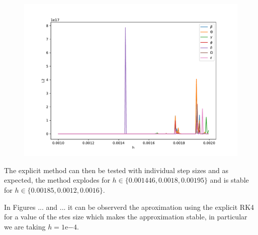 \documentclass{report}
\begin{document}
\begin{figure}[h]
\begin{minipage}[t]{0.5	\textwidth}
\centering
\includegraphics[width=\textwidth]{../Plots/RK4_Proj2/L2_norm_different_k.pdf}
\end{minipage}
\end{figure}


The explicit method can then be tested with individual step sizes and as expected, the method explodes for $h \in \{0.001446, 0.0018, 0.00195\}$ and is stable for $h \in \{0.00185, 0.0012, 0.0016\}$.

In Figures ... and ... it can be observerd the aproximation using the explicit RK4 for a value of the stes size which makes the approximation stable, in particular we are taking $h=1\mathrm{e}{-4}$.
\end{document}
